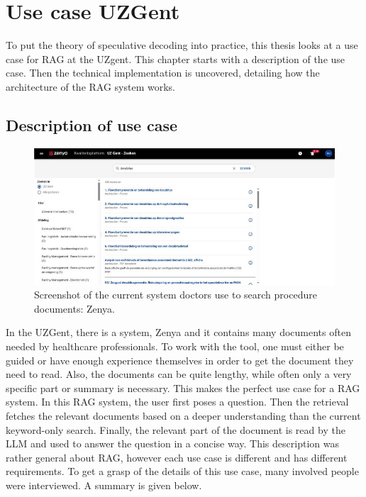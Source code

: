 
\chapter{Use case UZGent}
To put the theory of speculative decoding into practice, this thesis looks at a use case for RAG at the UZgent. This chapter starts with a description of the use case. Then the technical implementation is uncovered, detailing how the architecture of the RAG system works.

\section{Description of use case}

\begin{figure}[h]
	\centering
	\includegraphics[width=\linewidth]{fig/zenya.jpeg}
	\caption{Screenshot of the current system doctors use to search procedure documents: Zenya.}
	\label{fig:zenya}
\end{figure}

In the UZGent, there is a system, Zenya and it contains many documents often needed by healthcare professionals. To work with the tool, one must either be guided or have enough experience themselves in order to get the document they need to read. Also, the documents can be quite lengthy, while often only a very specific part or summary is necessary. This makes the perfect use case for a RAG system. In this RAG system, the user first poses a question. Then the retrieval fetches the relevant documents based on a deeper understanding than the current keyword-only search. Finally, the relevant part of the document is read by the LLM and used to answer the question in a concise way. This description was rather general about RAG, however each use case is different and has different requirements. To get a grasp of the details of this use case, many involved people were interviewed. A summary is given below.

